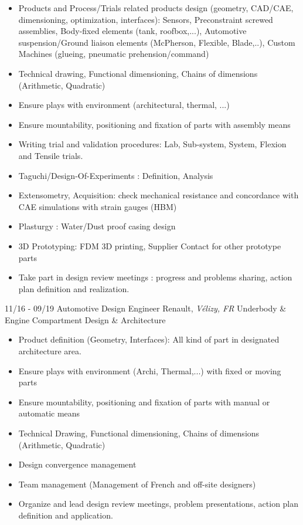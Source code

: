 \documentclass[]{friggeri-cv}
\begin{document}
\vspace{0.5mm}
\begin{itemize}
\setlength{\itemsep}{1pt}
\setlength{\parskip}{0pt}
\setlength{\parsep}{0pt}

\item Products and Process/Trials related products design (geometry, CAD/CAE, dimensioning, optimization, interfaces): Sensors, Preconstraint screwed assemblies, Body-fixed elements (tank, roofbox,...), Automotive suspension/Ground liaison elements (McPherson, Flexible, Blade,..), Custom Machines (glueing, pneumatic prehension/command)
\item Technical drawing, Functional dimensioning, Chains of dimensions (Arithmetic, Quadratic)
\item Ensure plays with environment (architectural, thermal, ...)
\item Ensure mountability, positioning and fixation of parts with assembly means
\item Writing trial and validation procedures: Lab, Sub-system, System, Flexion and Tensile trials.
\item Taguchi/Design-Of-Experiments : Definition, Analysis
\item Extensometry, Acquisition: check mechanical resistance and concordance with CAE simulations with strain gauges (HBM)
\item Plasturgy : Water/Dust proof casing design
\item 3D Prototyping: FDM 3D printing, Supplier Contact for other prototype parts
\item Take part in design review meetings : progress and problems sharing, action plan definition and realization.
\end{itemize}

\begin{entrylist}
  \entry
    {11/16 - 09/19}
    {Automotive Design Engineer}
    {Renault, \textit{Vélizy, FR}}
    {Underbody \& Engine Compartment Design \& Architecture}
\end{entrylist}
\vspace{-15pt}

\vspace{0.5mm}
\begin{itemize}
\setlength{\itemsep}{1pt}
\setlength{\parskip}{0pt}
\setlength{\parsep}{0pt}

\item Product definition (Geometry, Interfaces): All kind of part in designated architecture area.
\item Ensure plays with environment (Archi, Thermal,...) with fixed or moving parts
\item Ensure mountability, positioning and fixation of parts with manual or automatic means
\item Technical Drawing, Functional dimensioning, Chains of dimensions (Arithmetic, Quadratic)
\item Design convergence management
\item Team management (Management of French and off-site designers)
\item Organize and lead design review meetings, problem presentations, action plan definition and application.
\end{itemize}
\end{document}
